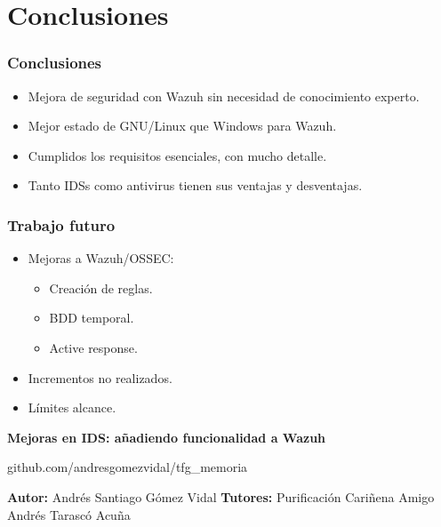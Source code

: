 \documentclass[a4paper,10pt]{beamer}
\newcommand{\linej}{\hfill\break}
\begin{document}
\section{Conclusiones}
\begin{frame}[fragile]
	\frametitle{Conclusiones}

	\begin{itemize}
		\item Mejora de seguridad con Wazuh sin necesidad de conocimiento experto. %
		\item Mejor estado de GNU/Linux que Windows para Wazuh. %
		\item Cumplidos los requisitos esenciales, con mucho detalle. %
		\item Tanto IDSs como antivirus tienen sus ventajas y desventajas.
	\end{itemize}
\end{frame}

\begin{frame}[fragile]
	\frametitle{Trabajo futuro}

	\begin{itemize}
		\item Mejoras a Wazuh/OSSEC:
		\begin{itemize}
			\item Creación de reglas. %
			\item BDD temporal. %
			\item Active response. %
		\end{itemize}
		\item Incrementos no realizados.
		\item Límites alcance.
	\end{itemize}
\end{frame}



\begin{frame}[fragile]
	\linej
	\linej
	\linej
	\large
	\centerline{\textbf{Mejoras en IDS: añadiendo funcionalidad a Wazuh}}
	\normalsize
	\linej
	\linej
	\centerline{github.com/andresgomezvidal/tfg\_memoria}
	\linej
	\linej
	\begin{multicols}{2}
	\textbf{Autor:}
	\linej
		Andrés Santiago Gómez Vidal
	\linej
	\columnbreak
	\linej
	\textbf{Tutores:}
	\linej
		Purificación Cariñena Amigo
	\linej
		Andrés Tarascó Acuña
	\end{multicols}
\end{frame}
\end{document}
